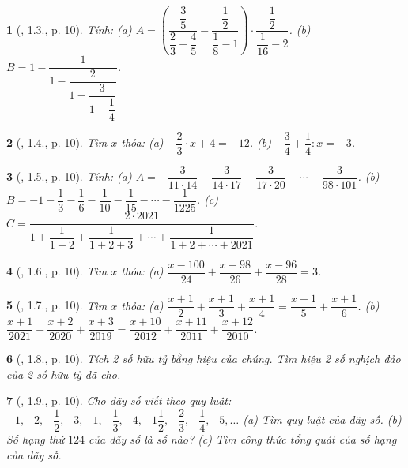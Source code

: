 \documentclass{article}
\newtheorem{baitoan}{}
\begin{document}
\begin{baitoan}[\cite{Binh_boi_duong_Toan_7_tap_1}, 1.3., p. 10]
	Tính: (a) $A = \left(\dfrac{\dfrac{3}{5}}{\dfrac{2}{3} - \dfrac{4}{5}} - \dfrac{\dfrac{1}{2}}{\dfrac{1}{8} - 1}\right)\cdot\dfrac{\dfrac{1}{2}}{\dfrac{1}{16} - 2}$. (b) $B = 1 - \dfrac{1}{1 - \dfrac{2}{1 - \dfrac{3}{1 - \dfrac{1}{4}}}}$.
\end{baitoan}

\begin{baitoan}[\cite{Binh_boi_duong_Toan_7_tap_1}, 1.4., p. 10]
	Tìm $x$ thỏa: (a) $-\dfrac{2}{3}\cdot x + 4 = -12$. (b) $-\dfrac{3}{4} + \dfrac{1}{4}:x = -3$.
\end{baitoan}

\begin{baitoan}[\cite{Binh_boi_duong_Toan_7_tap_1}, 1.5., p. 10]
	Tính: (a) $A = -\dfrac{3}{11\cdot14} - \dfrac{3}{14\cdot17} - \dfrac{3}{17\cdot20} - \cdots - \dfrac{3}{98\cdot101}$. (b) $B = -1 - \dfrac{1}{3} - \dfrac{1}{6} - \dfrac{1}{10} - \dfrac{1}{15} - \cdots - \dfrac{1}{1225}$. (c) $C = \dfrac{2\cdot2021}{1 + \dfrac{1}{1 + 2} + \dfrac{1}{1 + 2 + 3} + \cdots + \dfrac{1}{1 + 2 + \cdots + 2021}}$.
\end{baitoan}

\begin{baitoan}[\cite{Binh_boi_duong_Toan_7_tap_1}, 1.6., p. 10]
	Tìm $x$ thỏa: (a) $\dfrac{x - 100}{24} + \dfrac{x - 98}{26} + \dfrac{x - 96}{28} = 3$.
\end{baitoan}

\begin{baitoan}[\cite{Binh_boi_duong_Toan_7_tap_1}, 1.7., p. 10]
	Tìm $x$ thỏa: (a) $\dfrac{x + 1}{2} + \dfrac{x + 1}{3} + \dfrac{x + 1}{4} = \dfrac{x + 1}{5} + \dfrac{x + 1}{6}$. (b) $\dfrac{x + 1}{2021} + \dfrac{x + 2}{2020} + \dfrac{x + 3}{2019} = \dfrac{x + 10}{2012} + \dfrac{x + 11}{2011} + \dfrac{x + 12}{2010}$.
\end{baitoan}

\begin{baitoan}[\cite{Binh_boi_duong_Toan_7_tap_1}, 1.8., p. 10]
	Tích 2 số hữu tỷ bằng hiệu của chúng. Tìm hiệu 2 số nghịch đảo của 2 số hữu tỷ đã cho.
\end{baitoan}

\begin{baitoan}[\cite{Binh_boi_duong_Toan_7_tap_1}, 1.9., p. 10]
	Cho dãy số viết theo quy luật: $-1,-2,-\dfrac{1}{2},-3,-1,-\dfrac{1}{3},-4,-1\dfrac{1}{2},-\dfrac{2}{3},-\dfrac{1}{4},-5,\ldots$ (a) Tìm quy luật của dãy số. (b) Số hạng thứ $124$ của dãy số là số nào? (c) Tìm công thức tổng quát của số hạng của dãy số.
\end{baitoan}
\end{document}
